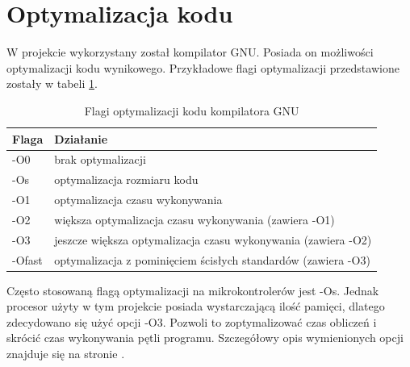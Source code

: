     \section{Optymalizacja kodu}
    W projekcie wykorzystany został kompilator GNU. Posiada on możliwości optymalizacji kodu wynikowego. Przykładowe flagi optymalizacji przedstawione zostały w tabeli \ref{tab:optynalizacja}.
    \begin{table}[ht]
		\centering
		\begin{tabular}{|l|l|} \hline
			\textbf{Flaga} & \textbf{Działanie} \\
			\hline
			\hline  -O0 &  brak optymalizacji \\
			\hline  -Os &  optymalizacja rozmiaru kodu\\
			\hline 	-O1 &  optymalizacja czasu wykonywania\\
			\hline 	-O2 &  większa optymalizacja czasu wykonywania (zawiera -O1)\\
			\hline  -O3 &  jeszcze większa optymalizacja czasu wykonywania (zawiera -O2)\\
			\hline 	-Ofast & optymalizacja z pominięciem ścisłych standardów (zawiera -O3)  \\
			\hline
		\end{tabular}
		\caption{Flagi optymalizacji kodu kompilatora GNU}
		\label{tab:optynalizacja}
	\end{table}
	Często stosowaną flagą optymalizacji na mikrokontrolerów jest -Os. Jednak procesor użyty w tym projekcie posiada wystarczającą ilość pamięci, dlatego zdecydowano się użyć opcji -O3. Pozwoli to zoptymalizować czas obliczeń i skrócić czas wykonywania pętli programu. Szczegółowy opis wymienionych opcji znajduje się na stronie \cite{flagiGNUstrona}.
